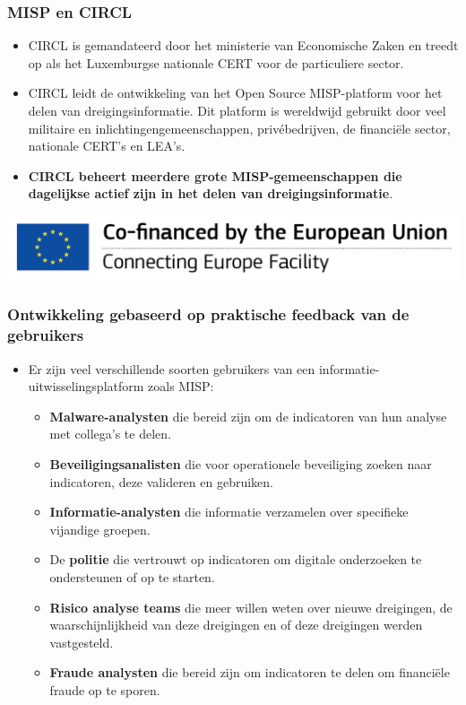 \begin{frame}
\frametitle{MISP en CIRCL}
\begin{itemize}
\item CIRCL is gemandateerd door het ministerie van Economische Zaken en treedt op als het Luxemburgse nationale CERT voor de particuliere sector.
\item CIRCL leidt de ontwikkeling van het Open Source MISP-platform voor het delen van dreigingsinformatie. Dit platform is wereldwijd gebruikt door veel militaire en inlichtingengemeenschappen, privébedrijven, de financiële sector, nationale CERT's en LEA's.
\item {\bf CIRCL beheert meerdere grote MISP-gemeenschappen die dagelijkse actief zijn in het delen van dreigingsinformatie}.
\end{itemize}
        \includegraphics{en_cef.png}
\end{frame}


\begin{frame}
\frametitle{Ontwikkeling gebaseerd op praktische feedback van de gebruikers}
\begin{itemize}
\item Er zijn veel verschillende soorten gebruikers van een informatie-uitwisselingsplatform zoals MISP:
        \begin{itemize}
                \item {\bf Malware-analysten} die bereid zijn om de indicatoren van hun analyse met collega's te delen.
                \item {\bf Beveiligingsanalisten} die voor operationele beveiliging zoeken naar indicatoren, deze valideren en gebruiken.
                \item {\bf Informatie-analysten} die informatie verzamelen over specifieke vijandige groepen.
                \item De {\bf politie} die vertrouwt op indicatoren om digitale onderzoeken te ondersteunen of op te starten.
                \item {\bf Risico analyse teams} die meer willen weten over nieuwe dreigingen, de waarschijnlijkheid van deze dreigingen en of deze dreigingen werden vastgesteld.
                \item {\bf Fraude analysten} die bereid zijn om indicatoren te delen om financiële fraude op te sporen.
        \end{itemize}
\end{itemize}
\end{frame}

